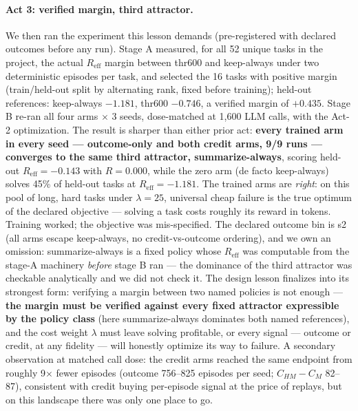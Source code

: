\documentclass{article}
\theoremstyle{remark}
\begin{document}
\paragraph{Act 3: verified margin, third attractor.} We then ran the
experiment this lesson demands (pre-registered with declared outcomes
before any run). Stage A measured, for all 52 unique tasks in the project,
the actual $R_{\text{eff}}$ margin between thr600 and keep-always under two
deterministic episodes per task, and selected the 16 tasks with positive
margin (train/held-out split by alternating rank, fixed before training);
held-out references: keep-always $-1.181$, thr600 $-0.746$, a verified
margin of $+0.435$. Stage B re-ran all four arms $\times$ 3 seeds,
dose-matched at 1{,}600 LLM calls, with the Act-2 optimization. The result
is sharper than either prior act: \textbf{every trained arm in every seed
--- outcome-only and both credit arms, 9/9 runs --- converges to the same
third attractor, summarize-always}, scoring held-out
$R_{\text{eff}} = -0.143$ with $R = 0.000$, while the zero arm (de facto
keep-always) solves 45\% of held-out tasks at $R_{\text{eff}} = -1.181$.
The trained arms are \emph{right}: on this pool of long, hard tasks under
$\lambda = 25$, universal cheap failure is the true optimum of the declared
objective --- solving a task costs roughly its reward in tokens. Training
worked; the objective was mis-specified. The declared outcome bin is s2
(all arms escape keep-always, no credit-vs-outcome ordering), and we own
an omission: summarize-always is a fixed policy whose $R_{\text{eff}}$ was
computable from the stage-A machinery \emph{before} stage B ran --- the
dominance of the third attractor was checkable analytically and we did not
check it. The design lesson finalizes into its strongest form: verifying a margin between
two named policies is not enough --- \textbf{the margin must be verified
against every fixed attractor expressible by the policy class} (here
summarize-always dominates both named references), and the cost weight
$\lambda$ must leave solving profitable, or every signal --- outcome or
credit, at any fidelity --- will honestly optimize its way to failure. A
secondary observation at matched call dose: the credit arms reached the
same endpoint from roughly 9$\times$ fewer episodes (outcome
756--825 episodes per seed; $C_{HM}-C_M$ 82--87), consistent with credit
buying per-episode signal at the price of replays, but on this landscape
there was only one place to go.
\end{document}
